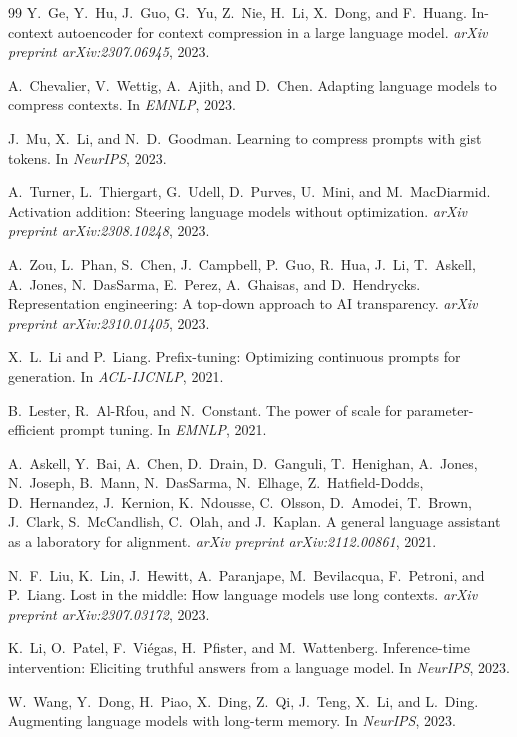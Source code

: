 \documentclass[11pt]{article}
\begin{document}
\begin{thebibliography}{99}
Y.~Ge, Y.~Hu, J.~Guo, G.~Yu, Z.~Nie, H.~Li, X.~Dong, and F.~Huang.
\newblock In-context autoencoder for context compression in a large language
  model.
\newblock \textit{arXiv preprint arXiv:2307.06945}, 2023.

A.~Chevalier, V.~Wettig, A.~Ajith, and D.~Chen.
\newblock Adapting language models to compress contexts.
\newblock In \textit{EMNLP}, 2023.

J.~Mu, X.~Li, and N.~D.~Goodman.
\newblock Learning to compress prompts with gist tokens.
\newblock In \textit{NeurIPS}, 2023.

A.~Turner, L.~Thiergart, G.~Udell, D.~Purves, U.~Mini, and M.~MacDiarmid.
\newblock Activation addition: Steering language models without optimization.
\newblock \textit{arXiv preprint arXiv:2308.10248}, 2023.

A.~Zou, L.~Phan, S.~Chen, J.~Campbell, P.~Guo, R.~Hua, J.~Li, T.~Askell,
A.~Jones, N.~DasSarma, E.~Perez, A.~Ghaisas, and D.~Hendrycks.
\newblock Representation engineering: A top-down approach to AI transparency.
\newblock \textit{arXiv preprint arXiv:2310.01405}, 2023.

X.~L.~Li and P.~Liang.
\newblock Prefix-tuning: Optimizing continuous prompts for generation.
\newblock In \textit{ACL-IJCNLP}, 2021.

B.~Lester, R.~Al-Rfou, and N.~Constant.
\newblock The power of scale for parameter-efficient prompt tuning.
\newblock In \textit{EMNLP}, 2021.

A.~Askell, Y.~Bai, A.~Chen, D.~Drain, D.~Ganguli, T.~Henighan,
A.~Jones, N.~Joseph, B.~Mann, N.~DasSarma, N.~Elhage, Z.~Hatfield-Dodds,
D.~Hernandez, J.~Kernion, K.~Ndousse, C.~Olsson, D.~Amodei, T.~Brown,
J.~Clark, S.~McCandlish, C.~Olah, and J.~Kaplan.
\newblock A general language assistant as a laboratory for alignment.
\newblock \textit{arXiv preprint arXiv:2112.00861}, 2021.

N.~F.~Liu, K.~Lin, J.~Hewitt, A.~Paranjape, M.~Bevilacqua, F.~Petroni, and P.~Liang.
\newblock Lost in the middle: How language models use long contexts.
\newblock \textit{arXiv preprint arXiv:2307.03172}, 2023.

K.~Li, O.~Patel, F.~Vi\'{e}gas, H.~Pfister, and M.~Wattenberg.
\newblock Inference-time intervention: Eliciting truthful answers from a language model.
\newblock In \textit{NeurIPS}, 2023.

W.~Wang, Y.~Dong, H.~Piao, X.~Ding, Z.~Qi, J.~Teng, X.~Li, and L.~Ding.
\newblock Augmenting language models with long-term memory.
\newblock In \textit{NeurIPS}, 2023.

\end{thebibliography}
\end{document}
